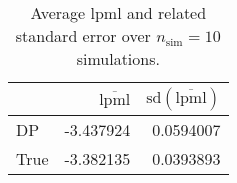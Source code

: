 \begin{table}[H]

\caption{Average lpml and related standard error over $n_{\text{sim}} = 10$ simulations.}
\centering
\begin{tabular}[t]{lrr}
\toprule
  & $\overbar{\text{lpml}}$ & $\text{sd}(\overbar{\text{lpml}})$\\
\midrule
DP & -3.437924 & 0.0594007\\
True & -3.382135 & 0.0393893\\
\bottomrule
\end{tabular}
\end{table}
